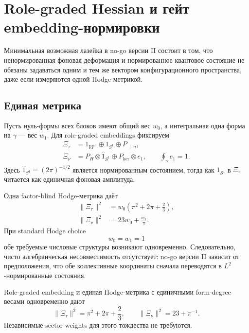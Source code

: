 \chapter{Role-graded Hessian и гейт embedding-нормировки}

Минимальная возможная лазейка в no-go версии II состоит в том, что
ненормированная фоновая деформация и нормированное квантовое состояние не
обязаны задаваться одним и тем же вектором конфигурационного пространства,
даже если измеряются одной Hodge-метрикой.

\section{Единая метрика}

Пусть нуль-формы всех блоков имеют общий вес \(w_0\), а интегральная
одна форма на \(\gamma\) --- вес \(w_1\). Для role-graded embeddings
фиксируем
\begin{align}
 \Xi_\tau
 &=1_{\mathbb{RP}^3}\oplus1_{S^1}\oplus P_{\perp n},\\
 \Xi_\nu
 &=P_H\otimes\widehat 1_{S^1}
   \oplus P_{\ker}\otimes e_1,
 \qquad \oint_\gamma e_1=1.
\end{align}
Здесь \(\widehat1_{S^1}=(2\pi)^{-1/2}\) является нормированным состоянием,
тогда как \(1_{S^1}\) в \(\Xi_\tau\) читается как единичная фоновая
амплитуда.

Одна factor-blind Hodge-метрика даёт
\begin{align}
 \|\Xi_\tau\|^2
 &=w_0\left(\pi^2+2\pi+\frac23\right),\label{eq:V3TauHessian}\\
 \|\Xi_\nu\|^2
 &=23w_0+\frac{w_1}{\pi}.\label{eq:V3NuHessian}
\end{align}
При standard Hodge choice
\begin{equation}
 w_0=w_1=1
\end{equation}
обе требуемые числовые структуры возникают одновременно. Следовательно,
чисто алгебраическая несовместимость отсутствует: no-go версии II зависит
от предположения, что обе коллективные координаты сначала переводятся в
\(L^2\)-нормированные состояния.

\begin{proposition}
Role-graded embedding и единая Hodge-метрика с единичными form-degree
весами одновременно дают
\begin{equation}
 \|\Xi_\tau\|^2=\pi^2+2\pi+\frac23,
 \qquad
 \|\Xi_\nu\|^2=23+\pi^{-1}.
\end{equation}
Независимые sector weights для этого тождества не требуются.
\end{proposition}

